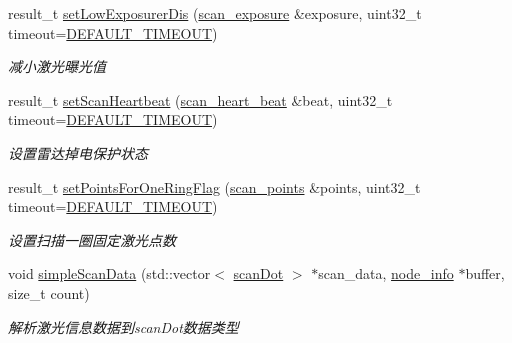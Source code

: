 \begin{DoxyCompactItemize}
result\+\_\+t \hyperlink{classydlidar_1_1_y_dlidar_driver_aece83871e5912d19bc7677676a5511f8}{set\+Low\+Exposurer\+Dis} (\hyperlink{structscan__exposure}{scan\+\_\+exposure} \&exposure, uint32\+\_\+t timeout=\hyperlink{classydlidar_1_1_y_dlidar_driver_a13a4f2dc4067b43794b2c47c06d5d27aa07c79ce96f468ff4b40495ef84584442}{D\+E\+F\+A\+U\+L\+T\+\_\+\+T\+I\+M\+E\+O\+UT})
\begin{DoxyCompactList}\small\item\em 减小激光曝光值 ~\newline
\end{DoxyCompactList}\item 
result\+\_\+t \hyperlink{classydlidar_1_1_y_dlidar_driver_ab2d5434c9b640a38f9d3b43b07c0b3eb}{set\+Scan\+Heartbeat} (\hyperlink{structscan__heart__beat}{scan\+\_\+heart\+\_\+beat} \&beat, uint32\+\_\+t timeout=\hyperlink{classydlidar_1_1_y_dlidar_driver_a13a4f2dc4067b43794b2c47c06d5d27aa07c79ce96f468ff4b40495ef84584442}{D\+E\+F\+A\+U\+L\+T\+\_\+\+T\+I\+M\+E\+O\+UT})
\begin{DoxyCompactList}\small\item\em 设置雷达掉电保护状态 ~\newline
\end{DoxyCompactList}\item 
result\+\_\+t \hyperlink{classydlidar_1_1_y_dlidar_driver_a1c8d40889885386e6c5a7827b7747696}{set\+Points\+For\+One\+Ring\+Flag} (\hyperlink{structscan__points}{scan\+\_\+points} \&points, uint32\+\_\+t timeout=\hyperlink{classydlidar_1_1_y_dlidar_driver_a13a4f2dc4067b43794b2c47c06d5d27aa07c79ce96f468ff4b40495ef84584442}{D\+E\+F\+A\+U\+L\+T\+\_\+\+T\+I\+M\+E\+O\+UT})
\begin{DoxyCompactList}\small\item\em 设置扫描一圈固定激光点数 ~\newline
\end{DoxyCompactList}\item 
void \hyperlink{classydlidar_1_1_y_dlidar_driver_a797de2678c6c81c84a8126cf184a0254}{simple\+Scan\+Data} (std\+::vector$<$ \hyperlink{structscan_dot}{scan\+Dot} $>$ $\ast$scan\+\_\+data, \hyperlink{structnode__info}{node\+\_\+info} $\ast$buffer, size\+\_\+t count)
\begin{DoxyCompactList}\small\item\em 解析激光信息数据到scan\+Dot数据类型 ~\newline
\end{DoxyCompactList}\end{DoxyCompactItemize}
